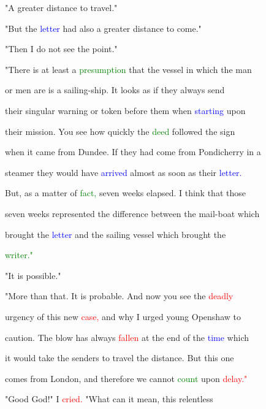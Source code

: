  "A greater distance to travel."



 "But the \textcolor{blue}{letter} had also a greater distance to come."



 "Then I do not see the point."



 "There is at least a \textcolor{green}{presumption} that the vessel in which the man

 or men are is a sailing-ship. It looks as if they always send

 their singular \textcolor{BurntOrange}{warning} or token before them when \textcolor{blue}{starting} upon

 their mission. You see how quickly the \textcolor{green}{deed} followed the sign

 when it came from Dundee. If they had come from Pondicherry in a

 steamer they would have \textcolor{blue}{arrived} almost as soon as their \textcolor{blue}{letter.}

 But, as a matter of \textcolor{green}{fact,} seven weeks elapsed. I think that those

 seven weeks represented the difference between the mail-boat which

 brought the \textcolor{blue}{letter} and the sailing vessel which brought the

 \textcolor{green}{writer."}



 "It is possible."



 "More than that. It is probable. And now you see the \textcolor{red}{deadly}

 \textcolor{BurntOrange}{urgency} of this new \textcolor{red}{case,} and why I urged \textcolor{BurntOrange}{young} Openshaw to

 \textcolor{BurntOrange}{caution.} The blow has always \textcolor{red}{fallen} at the end of the \textcolor{blue}{time} which

 it would take the senders to travel the distance. But this one

 comes from London, and therefore we cannot \textcolor{green}{count} upon \textcolor{red}{delay."}



 \textcolor{BurntOrange}{"Good} \textcolor{BurntOrange}{God!"} I \textcolor{red}{cried.} "What can it mean, this relentless

